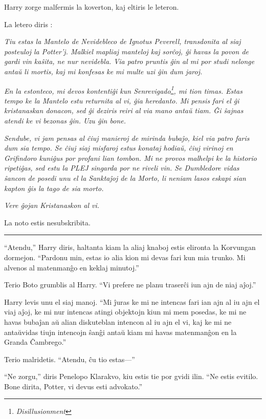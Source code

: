 Harry zorge malfermis la koverton, kaj eltiris le leteron.

La letero diris :

\emph{Tiu estas la Mantelo de Nevidebleco de Ignotus Peverell,
transdonita al siaj posteuloj la Potter'j. Malkiel mapliaj manteloj
kaj sorĉoj, ĝi havas la povon de gardi vin kaŝita, ne nur
nevidebla. Via patro pruntis ĝin al mi por studi nelonge antaŭ li
mortis, kaj mi konfesas ke mi multe uzi ĝin dum jaroj.}

\emph{En la estonteco, mi devos kontentiĝi kun
Senrevigado\footnote{\emph{Disillusionment}}, mi tion timas. Estas
tempo ke la Mantelo estu returnita al vi, ĝia heredanto. Mi pensis
fari el ĝi kristanaskan donacon, sed ĝi deziris reiri al via mano antaŭ
tiam. Ĝi ŝajnas atendi ke vi bezonas ĝin. Uzu ĝin bone.}

\emph{Sendube, vi jam pensas al ĉiuj manieroj de mirinda bubaĵo, kiel
via patro faris dum sia tempo. Se ĉiuj siaj misfaroj estus konataj
hodiaŭ, ĉiuj virinoj en Grifindoro kuniĝus por profani lian tombon. Mi
ne provos malhelpi ke la historio ripetiĝas, sed estu la PLEJ singarda
por ne riveli vin. Se Dumbledore vidas ŝancon de posedi unu el la
Sanktaĵoj de la Morto, li neniam lasos eskapi sian kapton ĝis la tago
de sia morto.}

\emph{Vere ĝojan Kristanaskon al vi.}

La noto estis nesubskribita.

\begin{center}\rule{3in}{0.4pt}\end{center}

``Atendu,'' Harry diris, haltanta kiam la aliaj knaboj estis elironta
la Korvungan dormejon. ``Pardonu min, estas io alia kion mi devas fari
kun mia trunko. Mi alvenos al matenmanĝo en keklaj minutoj.''

Terio Boto grumblis al Harry. ``Vi prefere ne planu traserĉi iun ajn
de niaj aĵoj.''

Harry levis unu el siaj manoj. ``Mi ĵuras ke mi ne intencas fari ian
ajn al iu ajn el viaj aĵoj, ke mi nur intencas atingi objektojn kiun
mi mem posedas, ke mi ne havas bubaĵan aŭ alian diskuteblan intencon
al iu ajn el vi, kaj ke mi ne antaŭvidas tiujn intencojn ŝanĝi antaŭ
kiam mi havas matenmanĝon en la Granda Ĉambrego.''

Terio malridetis. ``Atendu, ĉu tio estas—''

``Ne zorgu,'' diris Penelopo Klarakvo, kiu estis tie por gvidi
ilin. ``Ne estis evitilo. Bone dirita, Potter, vi devus esti
advokato.''

